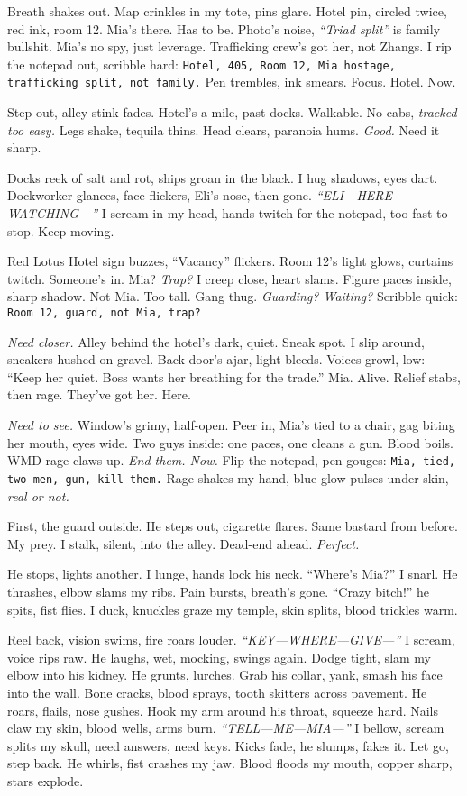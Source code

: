 \documentclass[12pt,oneside]{book} %
\newcommand{\note}[1]{\texttt{#1}}
\begin{document}
Breath shakes out. Map crinkles in my tote, pins glare. Hotel pin, circled twice, red ink, room 12. Mia’s there. Has to be. Photo’s noise, \textit{“Triad split”} is family bullshit. Mia’s no spy, just leverage. Trafficking crew’s got her, not Zhangs. I rip the notepad out, scribble hard: \note{Hotel, 405, Room 12, Mia hostage, trafficking split, not family.} Pen trembles, ink smears. Focus. Hotel. Now.

Step out, alley stink fades. Hotel’s a mile, past docks. Walkable. No cabs, \textit{tracked too easy.} Legs shake, tequila thins. Head clears, paranoia hums. \textit{Good.} Need it sharp.

Docks reek of salt and rot, ships groan in the black. I hug shadows, eyes dart. Dockworker glances, face flickers, \textnormal{Eli}’s nose, then gone. \textit{“ELI—HERE—WATCHING—”} I scream in my head, hands twitch for the notepad, too fast to stop. Keep moving.

Red Lotus Hotel sign buzzes, “Vacancy” flickers. Room 12’s light glows, curtains twitch. Someone’s in. Mia? \textit{Trap?} I creep close, heart slams. Figure paces inside, sharp shadow. Not Mia. Too tall. Gang thug. \textit{Guarding? Waiting?} Scribble quick: \note{Room 12, guard, not Mia, trap?}

\textit{Need closer.} Alley behind the hotel’s dark, quiet. Sneak spot. I slip around, sneakers hushed on gravel. Back door’s ajar, light bleeds. Voices growl, low: “Keep her quiet. Boss wants her breathing for the trade.” Mia. Alive. Relief stabs, then rage. They’ve got her. Here.

\textit{Need to see.} Window’s grimy, half-open. Peer in, Mia’s tied to a chair, gag biting her mouth, eyes wide. Two guys inside: one paces, one cleans a gun. Blood boils. WMD rage claws up. \textit{End them. Now.} Flip the notepad, pen gouges: \note{Mia, tied, two men, gun, kill them.} Rage shakes my hand, blue glow pulses under skin, \textit{real or not.}

First, the guard outside. He steps out, cigarette flares. Same bastard from before. My prey. I stalk, silent, into the alley. Dead-end ahead. \textit{Perfect.}

He stops, lights another. I lunge, hands lock his neck. “Where’s Mia?” I snarl. He thrashes, elbow slams my ribs. Pain bursts, breath’s gone. “Crazy bitch!” he spits, fist flies. I duck, knuckles graze my temple, skin splits, blood trickles warm.

Reel back, vision swims, fire roars louder. \textit{“KEY—WHERE—GIVE—”} I scream, voice rips raw. He laughs, wet, mocking, swings again. Dodge tight, slam my elbow into his kidney. He grunts, lurches. Grab his collar, yank, smash his face into the wall. Bone cracks, blood sprays, tooth skitters across pavement. He roars, flails, nose gushes. Hook my arm around his throat, squeeze hard. Nails claw my skin, blood wells, arms burn. \textit{“TELL—ME—MIA—”} I bellow, scream splits my skull, need answers, need keys. Kicks fade, he slumps, fakes it. Let go, step back. He whirls, fist crashes my jaw. Blood floods my mouth, copper sharp, stars explode.
\end{document}
